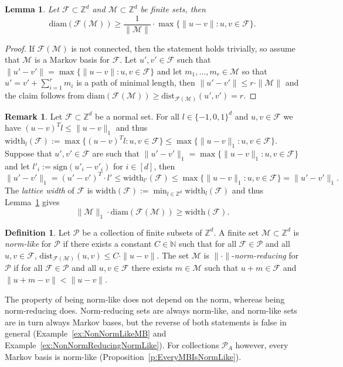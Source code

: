 \documentclass[11pt]{amsart}
\newtheorem{lemma}[thm]{Lemma}
\theoremstyle{definition}
\newtheorem{remark}[thm]{Remark}
\newtheorem{defn}[thm]{Definition}
\numberwithin{equation}{section}
\newcommand{\ring}[1]{\ensuremath{\mathbb{#1}}}
\renewcommand{\>}{\rangle}
\newcommand{\<}{\langle}
\newcommand{\0}{\mathbf{0}}
\newcommand{\1}{\mathbf{1}}
\newcommand{\2}{\mathbf{2}}
\newcommand\NN{\ring{N}}
\newcommand\ZZ{\ring{Z}}
\newcommand\cF{{\mathcal F}}
\newcommand\cM{{\mathcal M}}
\newcommand\cP{{\mathcal P}}
\newcommand{\diam}[1]{\mathrm{diam}(#1)}
\newcommand{\dist}[3]{\mathrm{dist}_{#1}(#2,#3)}
\begin{document}
\begin{lemma}\label{l:LowerBound}
Let $\cF\subset\ZZ^d$ and $\cM\subset\ZZ^d$ be finite sets, then
\begin{equation*}
\diam{\cF(\cM)}\ge\frac{1}{\|\cM\|}\cdot\max\{\|u-v\|: u,v\in\cF\}.
\end{equation*}
\end{lemma}
\begin{proof}
If $\cF(\cM)$ is not connected, then the statement holds
trivially, so assume that $\cM$ is a Markov basis for $\cF$.  Let $u',v'\in
\cF$ such that $\|u'-v'\|=\max\{\|u-v\|: u,v\in\cF\}$ and let
$m_1,\dots,m_r\in\cM$ so that $u'=v'+\sum_{i=1}^rm_i$ is a path of
minimal length, then $\|u'-v'\|\le r\cdot\|\cM\|$ and the claim follows
from $\diam{\cF(\cM)}\ge\dist{\cF(\cM)}{u'}{v'}=r$.
\end{proof}

\begin{remark}\label{r:LatticeWidth}
Let $\cF\subset\ZZ^d$ be a normal set. For all
$l\in\{-1,0,1\}^d$ and $u,v\in\cF$ we have $(u-v)^Tl\le\|u-v\|_1$ and
thus $\mathrm{width}_l(\cF):=\max\{(u-v)^Tl:
u,v\in\cF\}\le\max\{\|u-v\|_1: u,v\in\cF\}$. 
Suppose that $u',v'\in\cF$ are such that $\|u'-v'\|_1=\max\{\|u-v\|_1:
u,v\in\cF\}$ and let
$l'_i:=\mathrm{sign}(u'_i-v'_i)$ for $i\in[d]$, then
\begin{equation*}
\|u'-v'\|_1= (u'-v')^T\cdot l'\le\mathrm{width}_{l'}(\cF)\le\max\{\|u-v\|_1:
u,v\in\cF\}=\|u'-v'\|_1.
\end{equation*}
The \emph{lattice width} of $\cF$ is
$\mathrm{width}(\cF):=\min_{l\in\ZZ^d}\mathrm{width}_l(\cF)$ and thus
Lemma~\ref{l:LowerBound} gives
\begin{equation*}
\|\cM\|_1\cdot\diam{\cF(\cM)}\ge\mathrm{width}(\cF).
\end{equation*}
\end{remark}

\begin{defn}
Let $\cP$ be a collection of finite subsets of $\ZZ^d$. A
finite set $\cM\subset\ZZ^d$ is
\emph{norm-like} for $\cP$ if there exists a constant $C\in\NN$ such
that for all $\cF\in\cP$ and all $u,v\in\cF$, $\dist{\cF(\cM)}{u}{v}\le
C\cdot\|u-v\|$. The set $\cM$ is $\|\cdot\|$-\emph{norm-reducing} for $\cP$ if for
all $\cF\in\cP$ and all $u,v\in\cF$ there exists $m\in\cM$ such that
$u+m\in\cF$ and $\|u+m-v\|<\|u-v\|$.
\end{defn}

The property of being norm-like does not depend on the norm, whereas
being norm-reducing does. Norm-reducing sets are always norm-like, and
norm-like sets are in turn always Markov bases, but the reverse of both
statements is false in general (Example~\ref{ex:NonNormLikeMB}
and Example~\ref{ex:NonNormReducingNormLike}). For collections $\cP_A$
however, every Markov basis is norm-like
(Proposition~\ref{p:EveryMBIsNormLike}).
\end{document}

